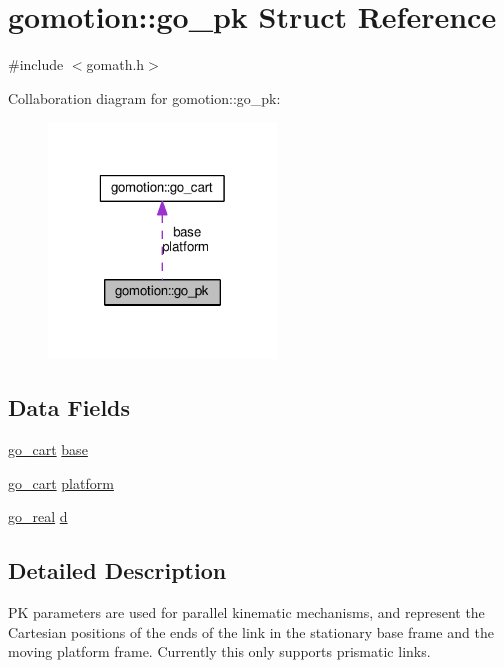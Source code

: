 \hypertarget{structgomotion_1_1go__pk}{\section{gomotion\-:\-:go\-\_\-pk Struct Reference}
\label{structgomotion_1_1go__pk}
}


{\ttfamily \#include $<$gomath.\-h$>$}



Collaboration diagram for gomotion\-:\-:go\-\_\-pk\-:\nopagebreak
\begin{figure}[H]
\begin{center}
\leavevmode
\includegraphics[width=172pt]{d2/d22/structgomotion_1_1go__pk__coll__graph}
\end{center}
\end{figure}
\subsection*{Data Fields}
\begin{DoxyCompactItemize}
\item 
\hyperlink{structgomotion_1_1go__cart}{go\-\_\-cart} \hyperlink{structgomotion_1_1go__pk_aaf6f59205aa710b5c9f04a49d13c6ac6}{base}
\item 
\hyperlink{structgomotion_1_1go__cart}{go\-\_\-cart} \hyperlink{structgomotion_1_1go__pk_ab3407e97c5c78c53e361609b52b78962}{platform}
\item 
\hyperlink{gotypes_8h_afd666a2393eebd71ee455846ac9def9b}{go\-\_\-real} \hyperlink{structgomotion_1_1go__pk_aca6d69ffde00a2f9b3f61af53c5e3377}{d}
\end{DoxyCompactItemize}


\subsection{Detailed Description}
P\-K parameters are used for parallel kinematic mechanisms, and represent the Cartesian positions of the ends of the link in the stationary base frame and the moving platform frame. Currently this only supports prismatic links. 

